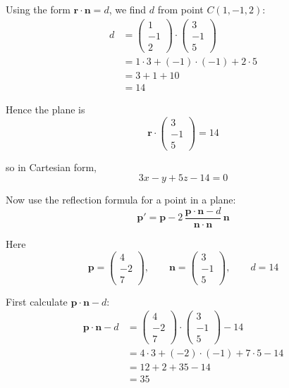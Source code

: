 \documentclass[leqno]{article}
\begin{document}
\begin{enumerate}[
  label=\textbf{\arabic*.},
  leftmargin=*,
  topsep=0pt,
  partopsep=0pt,
  parsep=0pt
]
\begin{djsSolution}
Using the form \(\mathbf r\cdot\mathbf n=d\), we find \(d\) from point \(C(1,-1,2)\):
\begin{align*}
d&=\begin{pmatrix}1\\-1\\2\end{pmatrix}\cdot\begin{pmatrix}3\\-1\\5\end{pmatrix}\\
&=1\cdot 3+(-1)\cdot(-1)+2\cdot 5\\
&=3+1+10\\
&=14
\end{align*}

Hence the plane is
\[
\mathbf r\cdot\begin{pmatrix}3\\-1\\5\end{pmatrix}=14
\]

so in Cartesian form,
\[
3x-y+5z-14=0
\]

Now use the reflection formula for a point in a plane:
\[
\mathbf p'
=\mathbf p
-2\,\frac{\mathbf p\cdot\mathbf n-d}{\mathbf n\cdot\mathbf n}\,\mathbf n
\]

Here
\[
\mathbf p=\begin{pmatrix}4\\-2\\7\end{pmatrix},\qquad \mathbf n=\begin{pmatrix}3\\-1\\5\end{pmatrix},\qquad d=14
\]

First calculate \(\mathbf p\cdot\mathbf n-d\):
\begin{align*}
\mathbf p\cdot\mathbf n-d
&=\begin{pmatrix}4\\-2\\7\end{pmatrix}\cdot\begin{pmatrix}3\\-1\\5\end{pmatrix}-14\\
&=4\cdot 3+(-2)\cdot(-1)+7\cdot 5-14\\
&=12+2+35-14\\
&=35
\end{align*}


\end{djsSolution}
\end{enumerate}
\end{document}
